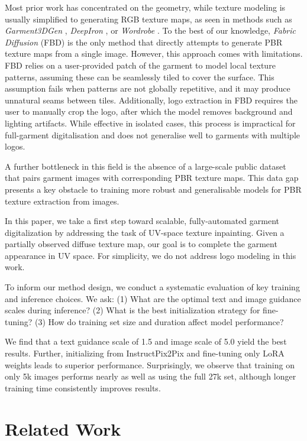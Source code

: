 \documentclass[11pt,twocolumn]{article}
\begin{document}
Most prior work has concentrated on the geometry, while texture modeling is usually simplified to generating RGB texture maps, as seen in methods such as \textit{Garment3DGen} \cite{garment3dgen}, \textit{DeepIron} \cite{deepiron}, or \textit{Wordrobe} \cite{WordRobe}. To the best of our knowledge, \textit{Fabric Diffusion} (FBD) \cite{fabricdiffusion} is the only method that directly attempts to generate PBR texture maps from a single image. However, this approach comes with limitations. FBD relies on a user-provided patch of the garment to model local texture patterns, assuming these can be seamlessly tiled to cover the surface. This assumption fails when patterns are not globally repetitive, and it may produce unnatural seams between tiles. Additionally, logo extraction in FBD requires the user to manually crop the logo, after which the model removes background and lighting artifacts. While effective in isolated cases, this process is impractical for full-garment digitalisation and does not generalise well to garments with multiple logos.

A further bottleneck in this field is the absence of a large-scale public dataset that pairs garment images with corresponding PBR texture maps. This data gap presents a key obstacle to training more robust and generalisable models for PBR texture extraction from images.

In this paper, we take a first step toward scalable, fully-automated garment digitalization by addressing the task of UV-space texture inpainting. Given a partially observed diffuse texture map, our goal is to complete the garment appearance in UV space. For simplicity, we do not address logo modeling in this work.

To inform our method design, we conduct a systematic evaluation of key training and inference choices. We ask: (1) What are the optimal text and image guidance scales during inference? (2) What is the best initialization strategy for fine-tuning? (3) How do training set size and duration affect model performance?

We find that a text guidance scale of 1.5 and image scale of 5.0 yield the best results. Further, initializing from InstructPix2Pix and fine-tuning only LoRA weights leads to superior performance. Surprisingly, we observe that training on only 5k images performs nearly as well as using the full 27k set, although longer training time consistently improves results.

\section{Related Work}
\end{document}
